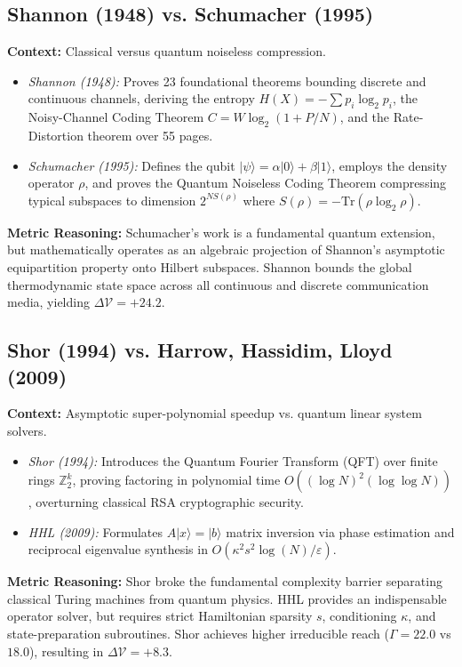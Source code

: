 \documentclass[twocolumn,10pt,letterpaper]{article}
\begin{document}
\subsection{Shannon (1948) vs. Schumacher (1995)}
\textbf{Context:} Classical versus quantum noiseless compression.
\begin{itemize}
\item \textit{Shannon (1948):} Proves 23 foundational theorems bounding discrete and continuous channels, deriving the entropy $H(X) = -\sum p_i \log_2 p_i$, the Noisy-Channel Coding Theorem $C = W \log_2(1 + P/N)$, and the Rate-Distortion theorem over 55 pages.
\item \textit{Schumacher (1995):} Defines the qubit $|\psi\rangle = \alpha|0\rangle + \beta|1\rangle$, employs the density operator $\rho$, and proves the Quantum Noiseless Coding Theorem compressing typical subspaces to dimension $2^{N S(\rho)}$ where $S(\rho) = -\mathrm{Tr}(\rho \log_2 \rho)$.
\end{itemize}
\textbf{Metric Reasoning:} Schumacher's work is a fundamental quantum extension, but mathematically operates as an algebraic projection of Shannon's asymptotic equipartition property onto Hilbert subspaces. Shannon bounds the global thermodynamic state space across all continuous and discrete communication media, yielding $\Delta \mathcal{V} = +24.2$.

\subsection{Shor (1994) vs. Harrow, Hassidim, Lloyd (2009)}
\textbf{Context:} Asymptotic super-polynomial speedup vs. quantum linear system solvers.
\begin{itemize}
\item \textit{Shor (1994):} Introduces the Quantum Fourier Transform (QFT) over finite rings $\mathbb{Z}_2^k$, proving factoring in polynomial time $O((\log N)^2 (\log \log N))$, overturning classical RSA cryptographic security.
\item \textit{HHL (2009):} Formulates $A|x\rangle = |b\rangle$ matrix inversion via phase estimation and reciprocal eigenvalue synthesis in $O(\kappa^2 s^2 \log(N)/\varepsilon)$.
\end{itemize}
\textbf{Metric Reasoning:} Shor broke the fundamental complexity barrier separating classical Turing machines from quantum physics. HHL provides an indispensable operator solver, but requires strict Hamiltonian sparsity $s$, conditioning $\kappa$, and state-preparation subroutines. Shor achieves higher irreducible reach ($\Gamma = 22.0$ vs $18.0$), resulting in $\Delta \mathcal{V} = +8.3$.
\end{document}
